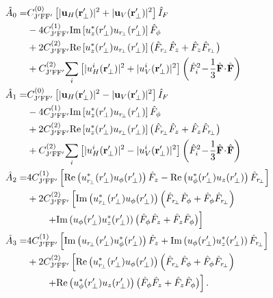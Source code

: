 \documentclass[preprint,aps,pra,onecolumn]{revtex4-1} %
\begin{document}
\begin{subequations} \label{Eq::StokesSpinOps}
\begin{align}
	\hat{A}_0 = & C^{(0)}_{\rm J'F F'} \left[|\mathbf{u}_{H}(\br'_\perp)|^2+ |\mathbf{u}_{V}(\br'_\perp)|^2 \right]\hat{I}_F \nonumber\\
	&-4C^{(1)}_{\rm J'FF'} \mathrm{Im}\left[u_z^*(r_\perp^\prime)u_{r\!_\perp}(r_\perp^\prime) \right]\hat{F}_\phi \nonumber\\
	&+ 2C^{(2)}_{\rm J'FF'}  \mathrm{Re}\left[u_z^*(r_\perp^\prime)u_{r\!_\perp}(r_\perp^\prime) \right]\big(\hat{F}_{r\!_\perp}\hat{F}_z+\hat{F}_z\hat{F}_{r\!_\perp} \big)\nonumber\\
	&+ C^{(2)}_{\rm J'FF'}\!\sum_i \left[|u^{i}_{H}(\br'_\perp)|^2 + |u^{i}_{V}(\br'_\perp)|^2 \right] \left(  \hat{F}_i^{2}\! -\! \frac{1}{3}\hat{\bf{F}}\! \cdot\!  \hat{\bf{F}} \right) \\
	\hat{A}_1 = & C^{(0)}_{\rm J'F F'} \left[|\mathbf{u}_{H}(\br'_\perp)|^2- |\mathbf{u}_{V}(\br'_\perp)|^2 \right]\hat{I}_F \nonumber\\
	& -4C^{(1)}_{\rm J'FF'} \mathrm{Im}\left[u_z^*(r_\perp^\prime)u_{r\!_\perp}(r_\perp^\prime) \right]\hat{F}_\phi \nonumber\\
	&+2 C^{(2)}_{\rm J'FF'}  \mathrm{Re}\left[u_z^*(r_\perp^\prime)u_{r\!_\perp}(r_\perp^\prime) \right]\big(\hat{F}_{r\!_\perp}\hat{F}_z+\hat{F}_z\hat{F}_{r\!_\perp} \big)\nonumber\\
	&+ C^{(2)}_{\rm J'FF'}\!\sum_i \left[|u^{i}_{H}(\br'_\perp)|^2- |u^{i}_{V}(\br'_\perp)|^2 \right] \left(  \hat{F}_i^{2}\! -\! \frac{1}{3}\hat{\bf{F}}\! \cdot\!  \hat{\bf{F}} \right) \\
	\hat{A}_2 = & 4C^{(1)}_{\rm J'FF'} \left[ \mathrm{Re} \left(u_{r\!_\perp}^*(r_\perp^\prime)u_\phi(r_\perp^\prime) \right)\hat{F}_z  -\mathrm{Re}\left( u_\phi^*(r_\perp^\prime) u_z(r_\perp^\prime) \right)\hat{F}_{r\!_\perp}\right] \nonumber\\
	&+2 C^{(2)}_{\rm J'FF'} \left[ \mathrm{Im} \left( u_{r\!_\perp}^*(r_\perp^\prime)u_\phi(r_\perp^\prime) \right)\left(\hat{F}_{r\!_\perp}\hat{F}_\phi +\hat{F}_\phi\hat{F}_{r\!_\perp} \right)\right.\nonumber\\
	&\quad \quad \left. + \mathrm{Im}\left( u_\phi(r_\perp^\prime) u_z^*(r_\perp^\prime) \right)\big(\hat{F}_\phi\hat{F}_z+\hat{F}_z\hat{F}_\phi \big)\right] \\
	\hat{A}_3 = & 4C^{(1)}_{\rm J'FF'} \left[\mathrm{Im} \left(u_{r\!_\perp}(r_\perp^\prime)u_\phi^*(r_\perp^\prime) \right)\hat{F}_z  +\mathrm{Im}\left( u_\phi(r_\perp^\prime) u_z^*(r_\perp^\prime) \right)\hat{F}_{r\!_\perp}\right] \nonumber\\
	&+ 2C^{(2)}_{\rm J'FF'} \left[ \mathrm{Re} \left( u_{r\!_\perp}^*(r_\perp^\prime)u_\phi(r_\perp^\prime) \right)\left(\hat{F}_{r\!_\perp}\hat{F}_\phi +\hat{F}_\phi\hat{F}_{r\!_\perp} \right)\right.\nonumber\\
	&\quad \quad \left. + \mathrm{Re}\left( u_\phi^*(r_\perp^\prime) u_z(r_\perp^\prime) \right)\big(\hat{F}_\phi\hat{F}_z+\hat{F}_z\hat{F}_\phi \big)\right].
\end{align}
\end{subequations}
\end{document}
